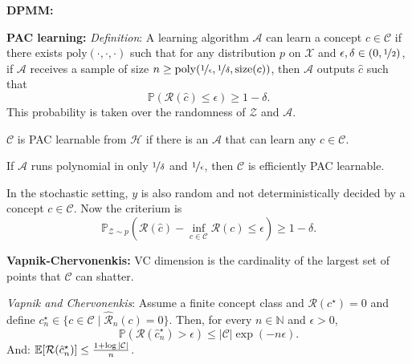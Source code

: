 \documentclass[9pt]{extarticle}
\newenvironment{topic}[1]
{\textbf{\sffamily \colorbox{black}{\rlap{\textbf{\textcolor{white}{#1}}}\hspace{\linewidth}\hspace{-2\fboxsep}}}}
{}
\newenvironment{subtopic}[1]
{\textbf{\sffamily #1:}}
{}
\begin{document}
\begin{multicols*}{3}
\begin{topic}{Non-parametric Bayesian methods}
\begin{subtopic}{DPMM}
        \end{subtopic}

    \end{topic}

    \begin{topic}{Statistical learning theory}

        \begin{subtopic}{PAC learning}
            \textit{Definition}: A learning algorithm $\mathcal{A}$ can learn a concept $c \in
                \mathcal{C}$ if there exists $\mathrm{poly}(\cdot, \cdot, \cdot)$ such that for any
            distribution $p$ on $\mathcal{X}$ and $\epsilon,\delta \in (0,\nicefrac{1}{2})$, if
            $\mathcal{A}$ receives a sample of size $n \geq \mathrm{poly}(\nicefrac{1}{\epsilon},
                \nicefrac{1}{\delta}, \mathrm{size}(c))$, then $\mathcal{A}$ outputs $\hat{c}$ such
            that \[
                \mathbb{P}(\mathcal{R}(\hat{c}) \leq \epsilon) \geq 1-\delta.
            \]
            This probability is taken over the randomness of $\mathcal{Z}$ and $\mathcal{A}$.

            $\mathcal{C}$ is PAC learnable from $\mathcal{H}$ if there is an $\mathcal{A}$ that can learn any $c \in \mathcal{C}$.

            If $\mathcal{A}$ runs polynomial in only $\nicefrac{1}{\delta}$ and $\nicefrac{1}{\epsilon}$, then
            $\mathcal{C}$ is efficiently PAC learnable.

            In the stochastic setting, $y$ is also random and not deterministically decided by a concept $c \in
                \mathcal{C}$. Now the criterium is \[
                \mathbb{P}_{\mathcal{Z} \sim p}(\mathcal{R}(\hat{c}) - \inf_{c \in \mathcal{C}} \mathcal{R}(c) \leq \epsilon) \geq 1-\delta.
            \]

        \end{subtopic}

        \begin{subtopic}{Vapnik-Chervonenkis}
            VC dimension is the cardinality of the largest set of points that $\mathcal{C}$ can shatter.

            \textit{Vapnik and Chervonenkis}: Assume a finite concept class and $\mathcal{R}(c^\star) = 0$ and define
            $c_n^\star \in \{ c \in \mathcal{C} \mid \hat{\mathcal{R}}_n(c) = 0 \}$. Then, for every $n \in
                \mathbb{N}$ and $\epsilon > 0$, \[
                \mathbb{P}(\mathcal{R}(\hat{c}^\star_n) > \epsilon) \leq |\mathcal{C}| \exp(-n \epsilon).
            \]
            And: $\mathbb{E}[\mathcal{R}(\hat{c}_n^\star)] \leq \frac{1 + \log |\mathcal{C}|}{n}$.


\end{subtopic}
\end{topic}
\end{multicols*}
\end{document}
